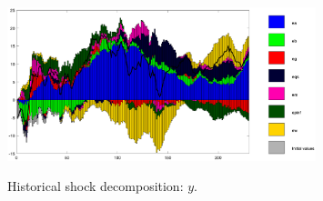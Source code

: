  
\begin{figure}[H]
\centering 
\includegraphics[width=0.8\textwidth]{Smets_Wouters_2007_45/graphs/Smets_Wouters_2007_45_shock_decomposition_y}
\label{Fig:shock_decomp:y}
\caption{Historical shock decomposition: $ {y} $.}
\end{figure}
 
 
